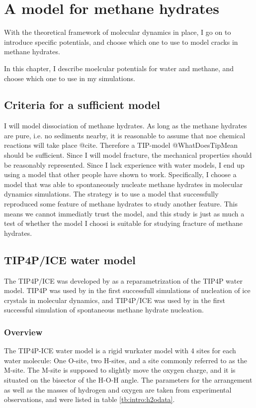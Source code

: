 \chapter{A model for methane hydrates}
\label{ch:models}
With the theoretical framework of molecular dynamics in place, I go on to introduce specific potentials, and choose which one to use to model cracks in methane hydrates. 

In this chapter, I describe moelcular potentials for water and methane, and choose which one to use in my simulations.  

\section{Criteria for a sufficient model}
I will model dissociation of methane hydrates. As long as the methane hydrates are pure, i.e. no sediments nearby, it is reasonable to assume that noe chemical reactions will take place @cite. Therefore a TIP-model @WhatDoesTipMean should be sufficient. Since I will model fracture, the mechanical properties should be reasonably represented. Since I lack experience with water models, I end up using a model that other people have shown to work. Specifically, I choose a model that was able to spontaneously nucleate methane hydrates in molecular dynamics simulations. The strategy is to use a model that successfully reproduced some feature of methane hydrates to study another feature. This means we cannot immediatly trust the model, and this study is just as much a test of whether the model I choosi is suitable for studying fracture of methane hydrates.

\section{TIP4P/ICE water model}
The TIP4P/ICE was developed by \citet{Abascal2005} as a reparametrization of the TIP4P water model. TIP4P was used by \citet{Matsumoto2002} in the first successfull simulations of nucleation of ice crystals in molecular dynamics, and TIP4P/ICE was used by \citet{Walsh2009} in the first successful simulation of spontaneous methane hydrate nucleation. 

\subsection{Overview}
The TIP4P-ICE water model is a rigid wnrkater model with 4 sites for each water molecule: One O-site, two H-sites, and a site commonly referred to as the M-site. The M-site is supposed to slightly move the oxygen charge, and it is situated on the bisector of the H-O-H angle. The parameters for the arrangement as well as the masses of hydrogen and oxygen are taken from experimental observations, and were listed in table \ref{tb:intro:h2odata}.

